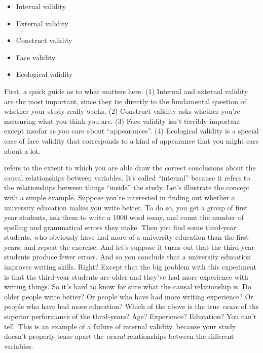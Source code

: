 \begin{itemize} \itemsep -2pt
\item Internal validity
\item External validity
\item Construct validity
\item Face validity
\item Ecological validity
\end{itemize}

First, a quick guide as to what matters here. (1) Internal and external validity are the most important, since they tie directly to the fundamental question of whether your study really works. (2) Construct validity asks whether you're measuring what you think you are. (3) Face validity isn't terribly important except insofar as you care about ``appearances''. (4) Ecological validity is a special case of face validity that corresponds to a kind of appearance that you might care about a lot.


 refers to the extent to which you are able draw the correct conclusions about the causal relationships between variables. It's called ``internal'' because it refers to the relationships between things ``inside'' the study.  Let's illustrate the concept with a simple example. Suppose you're interested in finding out whether a university education makes you write better. To do so, you get a group of first year students, ask them to write a 1000 word essay, and count the number of spelling and grammatical errors they make. Then you find some third-year students, who obviously have had more of a university education than the first-years, and repeat the exercise. And let's suppose it turns out that the third-year students produce fewer errors. And so you conclude that a university education improves writing skills. Right? Except that the big problem with this experiment is that the third-year students are older and they've had more experience with writing things. So it's hard to know for sure what the causal relationship is. Do older people write better? Or people who have had more writing experience? Or people who have had more education? Which of the above is the true {\it cause} of the superior performance of the third-years? Age? Experience? Education?  You can't tell.  This is an example of a failure of internal validity, because your study doesn't properly tease apart the {\it causal} relationships between the different variables. 

